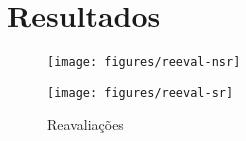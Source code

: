 \chapter{Resultados}
\label{resultados}

\begin{figure}[h]
    \centering
    \begin{minipage}{.4\textwidth}
        \texttt{[image: figures/reeval-nsr]}
        \label{fig:reeval-nsr}
    \end{minipage}%
    \quad
    \begin{minipage}{.4\textwidth}
        \texttt{[image: figures/reeval-sr]}
        \label{fig:reeval-sr}
    \end{minipage}

    \caption{Reavaliações}
\end{figure}

